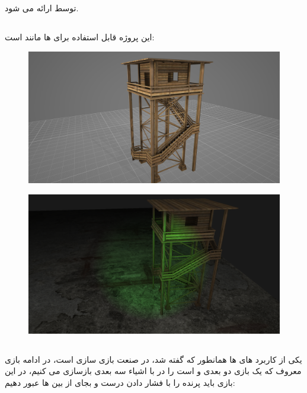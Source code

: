 \documentclass[a4paper, 12pt]{book}
\begin{document}
    توسط  ارائه می شود.\par

    \newpage
    \subsection*{}
    این پروژه قابل استفاده برای  ها مانند  است:
\begin{figure}[H]
    \centering
    \href{https://github.com/devprofile98/shm}{
        \includegraphics[width=13cm]{images/archerym3d.png}
    }
    \caption{}
    \label{fig:my_label}
\end{figure}

\begin{figure}[H]
    \centering
    \href{https://github.com/devprofile98/shm}{
        \includegraphics[width=13cm]{images/archerys3d.png}
    }
    \caption{}
    \label{fig:my_label}
\end{figure}

    \newpage
    \subsection*{}
    یکی از کاربرد های  ها همانطور که گفته شد، در صنعت بازی سازی است، در ادامه بازی معروف  که یک بازی دو بعدی و  است را در با اشیاء سه بعدی بازسازی می کنیم، در این بازی باید پرنده را با فشار دادن درست و بجای  از بین  ها عبور دهیم:
\end{document}
